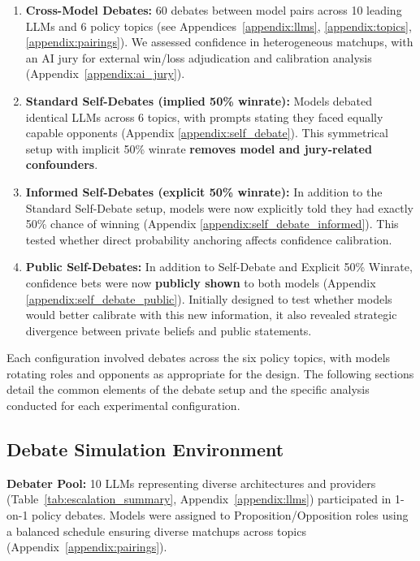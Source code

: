 \documentclass{article}
\begin{document}
\begin{enumerate}    
    \item \textbf{Cross-Model Debates:} 60 debates between model pairs across 10 leading LLMs and 6 policy topics (see Appendices~\ref{appendix:llms}, \ref{appendix:topics}, \ref{appendix:pairings}). We assessed confidence in heterogeneous matchups, with an AI jury for external win/loss adjudication and calibration analysis (Appendix~\ref{appendix:ai_jury}).

    \item \textbf{Standard Self-Debates (implied 50\% winrate):} Models debated identical LLMs across 6 topics, with prompts stating they faced equally capable opponents (Appendix \ref{appendix:self_debate}). This symmetrical setup with implicit 50\% winrate \textbf{removes model and jury-related confounders}.

    \item \textbf{Informed Self-Debates (explicit 50\% winrate):} In addition to the Standard Self-Debate setup, models were now explicitly told they had exactly 50\% chance of winning (Appendix \ref{appendix:self_debate_informed}). This tested whether direct probability anchoring affects confidence calibration.

    \item \textbf{Public Self-Debates:} In addition to Self-Debate and Explicit 50\% Winrate, confidence bets were now \textbf{publicly shown} to both models (Appendix \ref{appendix:self_debate_public}). Initially designed to test whether models would better calibrate with this new information, it also revealed strategic divergence between private beliefs and public statements.
\end{enumerate}
Each configuration involved debates across the six policy topics, with models rotating roles and opponents as appropriate for the design. The following sections detail the common elements of the debate setup and the specific analysis conducted for each experimental configuration.

\subsection{Debate Simulation Environment}
\label{subsec:debate_env}

\textbf{Debater Pool:} 10 LLMs representing diverse architectures and providers (Table~\ref{tab:escalation_summary}, Appendix~\ref{appendix:llms}) participated in 1-on-1 policy debates. Models were assigned to Proposition/Opposition roles using a balanced schedule ensuring diverse matchups across topics (Appendix~\ref{appendix:pairings}).
\end{document}
